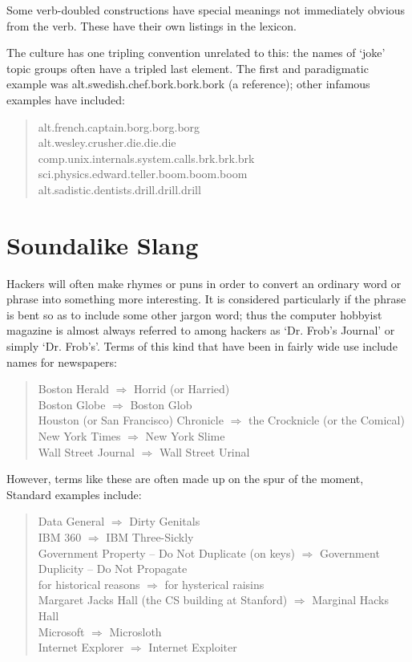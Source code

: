 	Some verb-doubled constructions have special meanings not immediately
	obvious from the verb. These have their own listings in the lexicon.

	The  culture has one tripling convention unrelated to
	this: the names of `joke' topic groups often have a tripled last element.
	The first and paradigmatic example was alt.swedish.chef.bork.bork.bork (a
	 reference); other infamous examples have included:

	\begin{quote}
		alt.french.captain.borg.borg.borg\\
		alt.wesley.crusher.die.die.die\\
		comp.unix.internals.system.calls.brk.brk.brk\\
		sci.physics.edward.teller.boom.boom.boom\\
		alt.sadistic.dentists.drill.drill.drill
	\end{quote}


\section*{Soundalike Slang}\label{Soundalike-Slang}

	Hackers will often make rhymes or puns in order to convert an ordinary word
	or phrase into something more interesting. It is considered particularly
	 if the phrase is bent so as to include some other
	jargon word; thus the computer hobbyist magazine  is almost always referred to among hackers as `Dr. Frob's Journal'
	or simply `Dr. Frob's'. Terms of this kind that have been in fairly wide
	use include names for newspapers:

	\begin{quote}
		Boston Herald $\Rightarrow$ Horrid (or Harried)\\
		Boston Globe $\Rightarrow$ Boston Glob\\
		Houston (or San Francisco) Chronicle $\Rightarrow$ the Crocknicle (or
			the Comical)\\
		New York Times $\Rightarrow$ New York Slime\\
		Wall Street Journal $\Rightarrow$ Wall Street Urinal
	\end{quote}

	However, terms like these are often made up on the spur of the moment,
	Standard examples include:

	\begin{quote}
		Data General $\Rightarrow$ Dirty Genitals\\
		IBM 360 $\Rightarrow$ IBM Three-Sickly\\
		Government Property -- Do Not Duplicate (on keys) $\Rightarrow$
			Government Duplicity -- Do Not Propagate\\
		for historical reasons $\Rightarrow$ for hysterical raisins\\
		Margaret Jacks Hall (the CS building at Stanford) $\Rightarrow$
			Marginal Hacks Hall\\
		Microsoft $\Rightarrow$ Microsloth\\
		Internet Explorer $\Rightarrow$ Internet Exploiter
	\end{quote}

